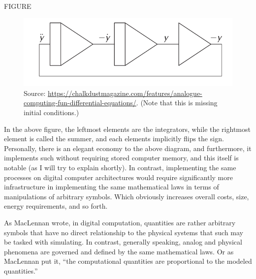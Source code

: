

\ifpdf
  FIGURE
\else
  \begin{figure}[H]
    \centering
    \includegraphics[width=0.7\linewidth,natwidth=500,natheight=200]{../assets/analogue-computing-fun-differential-equations.png}
    \caption{\bibent
    Source: \url{https://chalkdustmagazine.com/features/analogue-computing-fun-differential-equations/}. (Note that this is missing initial conditions.)}
    \label{Image Label}
\end{figure}
\fi

In the above figure, the leftmost elements are the integrators, while the rightmost element is called the summer, and each elements implicitly flips the sign. Personally, there is an elegant economy to the above diagram, and furthermore, it implements such without requiring stored computer memory, and this itself is notable (as I will try to explain shortly). In contrast, implementing the same processes on digital computer architectures would require significantly more infrastructure in implementing the same mathematical laws in terms of manipulations of arbitrary symbols. Which obviously increases overall costs, size, energy requirements, and so forth.

As MacLennan wrote, in digital computation, quantities are rather arbitrary symbols that have no direct relationship to the physical systems that such may be tasked with simulating. In contrast, generally speaking, analog and physical phenomena are governed and defined by the same mathematical laws. Or as MacLennan put it, ``the computational quantities are proportional to the modeled quantities.''

